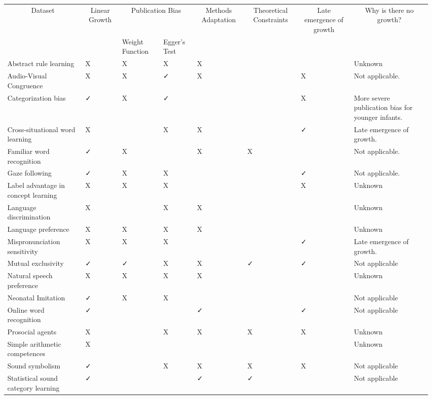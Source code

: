 \documentclass[
]{article}
\begin{document}
\begin{tabular}{llllllll}
\toprule
\multicolumn{1}{c}{Dataset} & \multicolumn{1}{c}{Linear Growth} & \multicolumn{2}{c}{Publication Bias} & \multicolumn{1}{c}{Methods Adaptation} & \multicolumn{1}{c}{Theoretical Constraints} & \multicolumn{1}{c}{Late emergence of growth} & \multicolumn{1}{c}{Why is there no growth?} \\
\cmidrule(l{3pt}r{3pt}){1-1} \cmidrule(l{3pt}r{3pt}){2-2} \cmidrule(l{3pt}r{3pt}){3-4} \cmidrule(l{3pt}r{3pt}){5-5} \cmidrule(l{3pt}r{3pt}){6-6} \cmidrule(l{3pt}r{3pt}){7-7} \cmidrule(l{3pt}r{3pt}){8-8}
 &  & Weight Function & Egger's Test &  &  &  & \\
\midrule
Abstract rule learning & X & X & X & X &  &  & Unknown\\
Audio-Visual Congruence & X & X & ✓ & X &  & X & Not applicable.\\
Categorization bias & ✓ & X & ✓ &  &  & X & More severe publication bias for younger infants.\\
Cross-situational word learning & X &  & X & X &  & ✓ & Late emergence of growth.\\
Familiar word recognition & ✓ & X &  & X & X &  & Not applicable.\\
\addlinespace
Gaze following & ✓ & X & X &  &  & ✓ & Not applicable.\\
Label advantage in concept learning & X & X & X &  &  & X & Unknown\\
Language discrimination & X &  & X & X &  &  & Unknown\\
Language preference & X & X & X & X &  &  & Unknown\\
Mispronunciation sensitivity & X & X & X &  &  & ✓ & Late emergence of growth.\\
\addlinespace
Mutual exclusivity & ✓ & ✓ & X & X & ✓ & ✓ & Not applicable\\
Natural speech preference & X & X & X & X &  &  & Unknown\\
Neonatal Imitation & ✓ & X & X &  &  &  & Not applicable\\
Online word recognition & ✓ &  &  & ✓ &  & ✓ & Not applicable\\
Prosocial agents & X &  & X & X & X & X & Unknown\\
\addlinespace
Simple arithmetic competences & X &  &  &  &  &  & Unknown\\
Sound symbolism & ✓ &  & X & X & X & X & Not applicable\\
Statistical sound category learning & ✓ &  &  & ✓ & ✓ &  & Not applicable\\

\end{tabular}
\end{document}
